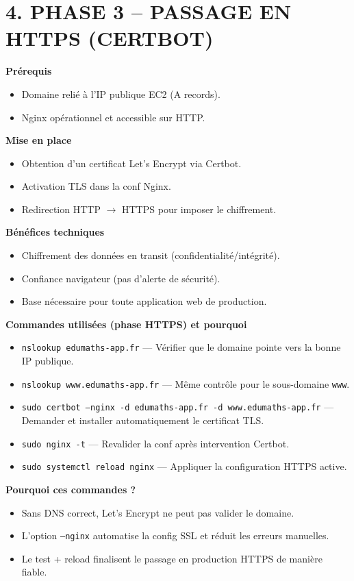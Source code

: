 \documentclass[10pt,a4paper]{article}
\begin{document}
\section{4. PHASE 3 -- PASSAGE EN HTTPS (CERTBOT)}

\textbf{Pr\'erequis}
\begin{itemize}
  \item Domaine reli\'e \`a l'IP publique EC2 (A records).
  \item Nginx op\'erationnel et accessible sur HTTP.
\end{itemize}

\textbf{Mise en place}
\begin{itemize}
  \item Obtention d'un certificat Let's Encrypt via Certbot.
  \item Activation TLS dans la conf Nginx.
  \item Redirection HTTP $\rightarrow$ HTTPS pour imposer le chiffrement.
\end{itemize}

\textbf{B\'en\'efices techniques}
\begin{itemize}
  \item Chiffrement des donn\'ees en transit (confidentialit\'e/int\'egrit\'e).
  \item Confiance navigateur (pas d'alerte de s\'ecurit\'e).
  \item Base n\'ecessaire pour toute application web de production.
\end{itemize}

\textbf{Commandes utilis\'ees (phase HTTPS) et pourquoi}
\begin{itemize}
  \item \texttt{nslookup edumaths-app.fr} --- V\'erifier que le domaine pointe vers la bonne IP publique.
  \item \texttt{nslookup www.edumaths-app.fr} --- M\^eme contr\^ole pour le sous-domaine \texttt{www}.
  \item \texttt{sudo certbot --nginx -d edumaths-app.fr -d www.edumaths-app.fr} --- Demander et installer automatiquement le certificat TLS.
  \item \texttt{sudo nginx -t} --- Revalider la conf apr\`es intervention Certbot.
  \item \texttt{sudo systemctl reload nginx} --- Appliquer la configuration HTTPS active.
\end{itemize}

\textbf{Pourquoi ces commandes ?}
\begin{itemize}
  \item Sans DNS correct, Let's Encrypt ne peut pas valider le domaine.
  \item L'option \texttt{--nginx} automatise la config SSL et r\'eduit les erreurs manuelles.
  \item Le test + reload finalisent le passage en production HTTPS de mani\`ere fiable.
\end{itemize}
\end{document}
